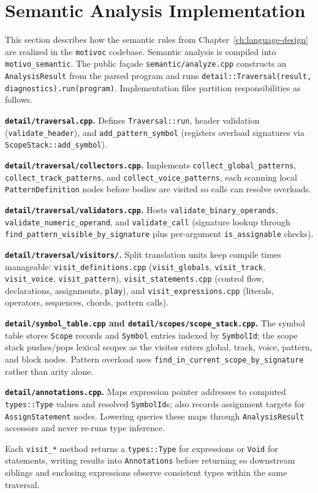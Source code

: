 \section{Semantic Analysis Implementation}\label{sec:semantic-implementation}

This section describes how the semantic rules from Chapter~\ref{ch:language-design} are realized in the
\texttt{motivoc} codebase.
Semantic analysis is compiled into \texttt{motivo\_semantic}.
The public façade \texttt{semantic/analyze.cpp} constructs an \texttt{AnalysisResult} from the parsed program and
runs \texttt{detail::Traversal(result, diagnostics).run(program)}.
Implementation files partition responsibilities as follows.

\noindent \textbf{\texttt{detail/traversal.cpp}.} Defines \texttt{Traversal::run}, header validation
(\texttt{validate\_header}), and \texttt{add\_pattern\_symbol} (registers overload signatures via
\texttt{ScopeStack::add\_symbol}).

\noindent \textbf{\texttt{detail/traversal/collectors.cpp}.} Implements \texttt{collect\_global\_patterns},
\texttt{collect\_track\_patterns}, and \texttt{collect\_voice\_patterns}, each scanning local \texttt{PatternDefinition}
nodes before bodies are visited so calls can resolve overloads.

\noindent \textbf{\texttt{detail/traversal/validators.cpp}.} Hosts \texttt{validate\_binary\_operands},
\texttt{validate\_numeric\_operand}, and \texttt{validate\_call} (signature lookup through
\texttt{find\_pattern\_visible\_by\_signature} plus per-argument \texttt{is\_assignable} checks).

\noindent \textbf{\texttt{detail/traversal/visitors/}.} Split translation units keep compile times manageable:
\texttt{visit\_definitions.cpp} (\texttt{visit\_globals}, \texttt{visit\_track}, \texttt{visit\_voice},
\texttt{visit\_pattern}), \texttt{visit\_statements.cpp} (control flow, declarations, assignments, \texttt{play}),
and \texttt{visit\_expressions.cpp} (literals, operators, sequences, chords, pattern calls).

\noindent \textbf{\texttt{detail/symbol\_table.cpp} and \texttt{detail/scopes/scope\_stack.cpp}.} The symbol table
stores \texttt{Scope} records and \texttt{Symbol} entries indexed by \texttt{SymbolId}; the scope stack pushes/pops
lexical scopes as the visitor enters global, track, voice, pattern, and block nodes.
Pattern overload uses \texttt{find\_in\_current\_scope\_by\_signature} rather than arity alone.

\noindent \textbf{\texttt{detail/annotations.cpp}.} Maps expression pointer addresses to computed \texttt{types::Type}
values and resolved \texttt{SymbolId}s; also records assignment targets for \texttt{AssignStatement} nodes.
Lowering queries these maps through \texttt{AnalysisResult} accessors and never re-runs type inference.

Each \texttt{visit\_*} method returns a \texttt{types::Type} for expressions or \texttt{Void} for statements, writing
results into \texttt{Annotations} before returning so downstream siblings and enclosing expressions observe consistent
types within the same traversal.
